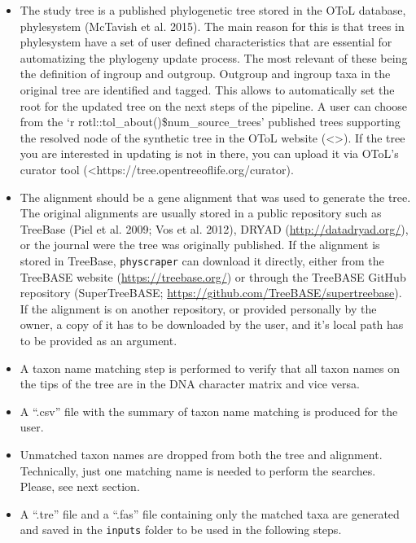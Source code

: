 \documentclass[draft]{ametsoc}
\begin{document}
\begin{itemize}
\tightlist
\item
  The study tree is a published phylogenetic tree stored in the OToL
  database, phylesystem (McTavish et al. 2015). The main reason for this
  is that trees in phylesystem have a set of user defined
  characteristics that are essential for automatizing the phylogeny
  update process. The most relevant of these being the definition of
  ingroup and outgroup. Outgroup and ingroup taxa in the original tree
  are identified and tagged. This allows to automatically set the root
  for the updated tree on the next steps of the pipeline. A user can
  choose from the `r rotl::tol\_about()\$num\_source\_trees' published
  trees supporting the resolved node of the synthetic tree in the OToL
  website (\textless{}\textgreater{}). If the tree you are interested in
  updating is not in there, you can upload it via OToL's curator tool
  (\textless{}https://tree.opentreeoflife.org/curator).
\item
  The alignment should be a gene alignment that was used to generate the
  tree. The original alignments are usually stored in a public
  repository such as TreeBase (Piel et al. 2009; Vos et al. 2012), DRYAD
  (\url{http://datadryad.org/}), or the journal were the tree was
  originally published. If the alignment is stored in TreeBase,
  \texttt{physcraper} can download it directly, either from the TreeBASE
  website (\url{https://treebase.org/}) or through the TreeBASE GitHub
  repository (SuperTreeBASE;
  \url{https://github.com/TreeBASE/supertreebase}). If the alignment is
  on another repository, or provided personally by the owner, a copy of
  it has to be downloaded by the user, and it's local path has to be
  provided as an argument.
\item
  A taxon name matching step is performed to verify that all taxon names
  on the tips of the tree are in the DNA character matrix and vice
  versa.
\item
  A ``.csv'' file with the summary of taxon name matching is produced
  for the user.
\item
  Unmatched taxon names are dropped from both the tree and alignment.
  Technically, just one matching name is needed to perform the searches.
  Please, see next section.
\item
  A ``.tre'' file and a ``.fas'' file containing only the matched taxa
  are generated and saved in the \texttt{inputs} folder to be used in
  the following steps.
\end{itemize}
\end{document}
